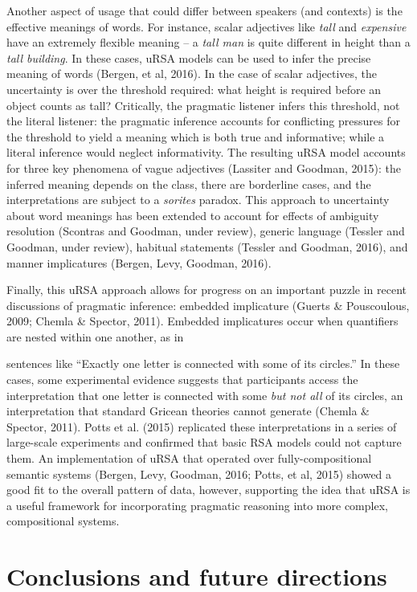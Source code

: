 \documentclass[]{elsarticle}
\begin{document}
Another aspect of usage that could differ between speakers (and
contexts) is the effective meanings of words. For instance, scalar
adjectives like \emph{tall} and \emph{expensive} have an extremely
flexible meaning -- a \emph{tall man} is quite different in height than
a \emph{tall building}. In these cases, uRSA models can be used to infer
the precise meaning of words (Bergen, et al, 2016). In the case of
scalar adjectives, the uncertainty is over the threshold required: what
height is required before an object counts as tall? Critically, the
pragmatic listener infers this threshold, not the literal listener: the
pragmatic inference accounts for conflicting pressures for the threshold
to yield a meaning which is both true and informative; while a literal
inference would neglect informativity. The resulting uRSA model accounts
for three key phenomena of vague adjectives (Lassiter and Goodman,
2015): the inferred meaning depends on the class, there are borderline
cases, and the interpretations are subject to a \emph{sorites} paradox.
This approach to uncertainty about word meanings has been extended to
account for effects of ambiguity resolution (Scontras and Goodman, under
review), generic language (Tessler and Goodman, under review), habitual
statements (Tessler and Goodman, 2016), and manner implicatures (Bergen,
Levy, Goodman, 2016).

Finally, this uRSA approach allows for progress on an important puzzle
in recent discussions of pragmatic inference: embedded implicature
(Guerts \& Pouscoulous, 2009; Chemla \& Spector, 2011). Embedded
implicatures occur when quantifiers are nested within one another, as in

sentences like ``Exactly one letter is connected with some of its
circles.'' In these cases, some experimental evidence suggests that
participants access the interpretation that one letter is connected with
some \emph{but not all} of its circles, an interpretation that standard
Gricean theories cannot generate (Chemla \& Spector, 2011). Potts et al.
(2015) replicated these interpretations in a series of large-scale
experiments and confirmed that basic RSA models could not capture them.
An implementation of uRSA that operated over fully-compositional
semantic systems (Bergen, Levy, Goodman, 2016; Potts, et al, 2015)
showed a good fit to the overall pattern of data, however, supporting
the idea that uRSA is a useful framework for incorporating pragmatic
reasoning into more complex, compositional systems.

\section{Conclusions and future directions}\label{conclusions-and-future-directions}
\end{document}
